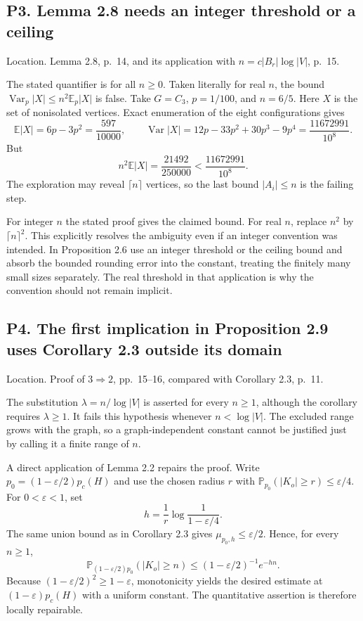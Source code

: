 \documentclass[10pt]{article}
\begin{document}
\subsection*{P3. Lemma 2.8 needs an integer threshold or a ceiling}
Location. Lemma 2.8, p. 14, and its application with \(n=c|B_r|\log|V|\), p. 15.\par
The stated quantifier is for all \(n\ge0\). Taken literally for real \(n\), the bound \(\operatorname{Var}_p|X|\le n^2\mathbb E_p|X|\) is false. Take \(G=C_3\), \(p=1/100\), and \(n=6/5\). Here \(X\) is the set of nonisolated vertices. Exact enumeration of the eight configurations gives \[\mathbb E|X|=6p-3p^2=\frac{597}{10000},\qquad
 \operatorname{Var}|X|=12p-33p^2+30p^3-9p^4
 =\frac{11672991}{10^8}.\] But \[n^2\mathbb E|X|=\frac{21492}{250000}
 <\frac{11672991}{10^8}.\] The exploration may reveal \(\lceil n\rceil\) vertices, so the last bound \(|A_i|\le n\) is the failing step.\par
For integer \(n\) the stated proof gives the claimed bound. For real \(n\), replace \(n^2\) by \(\lceil n\rceil^2\). This explicitly resolves the ambiguity even if an integer convention was intended. In Proposition 2.6 use an integer threshold or the ceiling bound and absorb the bounded rounding error into the constant, treating the finitely many small sizes separately. The real threshold in that application is why the convention should not remain implicit.\par
\subsection*{P4. The first implication in Proposition 2.9 uses Corollary 2.3 outside its domain}
Location. Proof of \(3\Rightarrow2\), pp. 15–16, compared with Corollary 2.3, p. 11.\par
The substitution \(\lambda=n/\log|V|\) is asserted for every \(n\ge1\), although the corollary requires \(\lambda\ge1\). It fails this hypothesis whenever \(n<\log|V|\). The excluded range grows with the graph, so a graph-independent constant cannot be justified just by calling it a finite range of \(n\).\par
A direct application of Lemma 2.2 repairs the proof. Write \(p_0=(1-\varepsilon/2)p_c(H)\) and use the chosen radius \(r\) with \(\mathbb P_{p_0}(|K_o|\ge r)\le\varepsilon/4\). For \(0<\varepsilon<1\), set \[h=\frac1r\log\frac1{1-\varepsilon/4}.\] The same union bound as in Corollary 2.3 gives \(\mu_{p_0,h}\le\varepsilon/2\). Hence, for every \(n\ge1\), \[\mathbb P_{(1-\varepsilon/2)p_0}(|K_o|\ge n)
 \le(1-\varepsilon/2)^{-1}e^{-hn}.\] Because \((1-\varepsilon/2)^2\ge1-\varepsilon\), monotonicity yields the desired estimate at \((1-\varepsilon)p_c(H)\) with a uniform constant. The quantitative assertion is therefore locally repairable.\par
\end{document}
